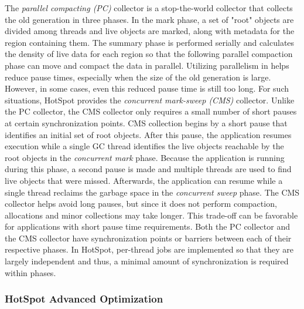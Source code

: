 \documentclass{sig-alternate}
\begin{document}
The \textit{parallel compacting (PC)} collector is a stop-the-world collector that collects the old generation in three phases. In the mark phase, a set of "root" objects are divided among threads and live objects are marked, along with metadata for the region containing them. The summary phase is performed serially and calculates the density of live data for each region so that the following parallel compaction phase can move and compact the data in parallel. Utilizing parallelism in helps reduce pause times, especially when the size of the old generation is large. However, in some cases, even this reduced pause time is still too long. For such situations, HotSpot provides the \textit{concurrent mark-sweep (CMS)} collector. Unlike the PC collector, the CMS collector only requires a small number of short pauses at certain synchronization points. CMS collection begins by a short pause that identifies an initial set of root objects. After this pause, the application resumes execution while a single GC thread identifies the live objects reachable by the root objects in the \textit{concurrent mark} phase. Because the application is running during this phase, a second pause is made and multiple threads are used to find live objects that were missed. Afterwards, the application can resume while a single thread reclaims the garbage space in the \textit{concurrent sweep} phase. The CMS collector helps avoid long pauses, but since it does not perform compaction, allocations and minor collections may take longer. This trade-off can be favorable for applications with short pause time requirements. Both the PC collector and the CMS collector have synchronization points or barriers between each of their respective phases. In HotSpot, per-thread jobs are implemented so that they are largely independent and thus, a minimal amount of synchronization is required within phases.

\subsubsection{HotSpot Advanced Optimization}
\end{document}
